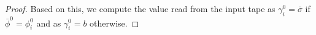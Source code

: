 \documentclass{article} %
\newcommand\changeB[1]{{\color{purple} #1}}
\renewcommand\changeB[1]{#1}
\begin{document}
\begin{proof}
    \changeB{Based on this, we compute the value read from the input tape as $\gamma^0_i = \bar{\sigma}$ if $\bar{\phi}^0 = \phi^0_i$ and as $\gamma^0_i = b$ otherwise.}


\end{proof}
\end{document}
